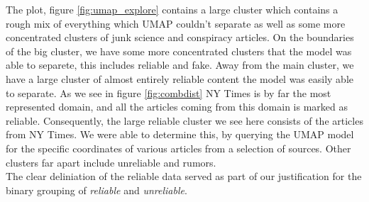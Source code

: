 The plot, figure \ref{fig:umap_explore} contains a large cluster which contains a rough mix of everything which UMAP
couldn't separate as well as some more concentrated clusters of junk science and conspiracy articles. On the boundaries
of the big cluster, we have some more concentrated clusters that the model was able to separete, this includes reliable
and fake. Away from the main cluster, we have a large cluster of almost entirely reliable content the model was easily able
to separate. As we see in figure \ref{fig:combdist} NY Times is by far the most represented domain, and all the
articles coming from this domain is marked as reliable. Consequently, the large reliable cluster we see here consists of the
articles from NY Times. We were able to determine this, by querying the UMAP model for the specific coordinates of various articles from a selection of sources. Other clusters far apart include unreliable and rumors.\\
The clear deliniation of the reliable data served as part of our justification for the binary grouping of \textit{reliable} and \textit{unreliable}. 



